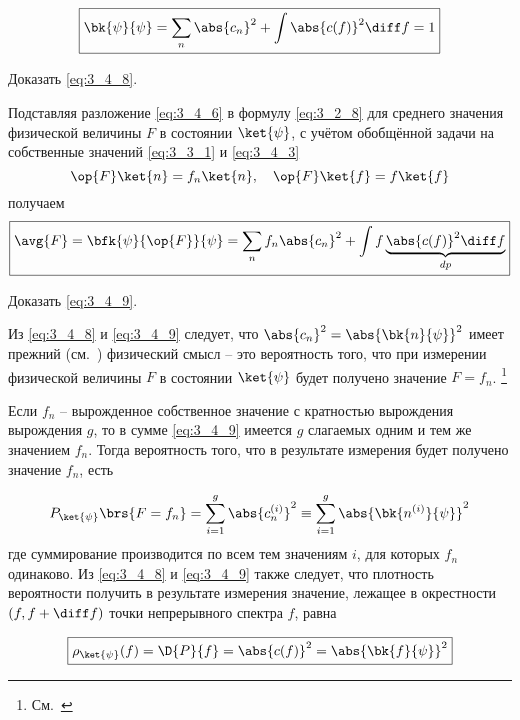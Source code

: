 \begin{equation}
\label{eq:3_4_8}
\boxed {
	\bk{\psi}{\psi} = \sum_n \abs{c_n}^2 + \int \abs{c(f)}^2 \diff f = 1
}
\end{equation}

\begin{excr}
Доказать \eqref{eq:3_4_8}.
\end{excr}


Подставляя разложение \eqref{eq:3_4_6} в формулу \eqref{eq:3_2_8} для среднего значения физической величины $F$ в состоянии $\ket{\psi}$, с учётом обобщённой задачи на собственные значений \eqref{eq:3_3_1} и \eqref{eq:3_4_3}
$$
\op{F} \ket{n} = f_n \ket{n}, ~~~ \op{F} \ket{f} = f \ket{f}
$$%
получаем
\begin{equation}
\label{eq:3_4_9}
\boxed {
	\avg{F} = \bfk{\psi}{\op{F}}{\psi} = \sum_n f_n \abs{c_n}^2 + \int f \underbrace{\abs{c(f)}^2 \diff f}_{dp}
}
\end{equation}

\begin{excr}
Доказать \eqref{eq:3_4_9}.
\end{excr}

Из \eqref{eq:3_4_8} и \eqref{eq:3_4_9} следует, что $\abs{c_n}^2 = \abs{\bk{n}{\psi}}^2$ имеет прежний (см.~) физический смысл -- это вероятность того, что при измерении физической величины $F$ в состоянии $\ket{\psi}$ будет получено значение $F = f_n$. \footnote{См.~}

Если $f_n$ -- вырожденное собственное значение с кратностью вырождения вырождения $g$, то в сумме \eqref{eq:3_4_9} имеется $g$ слагаемых одним и тем же значением $f_n$. Тогда вероятность того, что в результате измерения будет получено значение $f_n$, есть

\begin{equation}
\label{eq:3_4_10}
P_{\ket{\psi}} \brs{F = f_n} =
  \sum_{i=1}^{g} \abs{c_n^{(i)}}^2 \equiv
  \sum_{i=1}^{g} \abs{ \bk{n^{(i)}}{\psi} }^2
\end{equation}%
%
где суммирование производится по всем тем значениям $i$, для которых $f_n$ одинаково. Из \eqref{eq:3_4_8} и \eqref{eq:3_4_9} также следует, что плотность вероятности получить в результате измерения значение, лежащее в окрестности $(f, f + \diff f)$ точки непрерывного спектра $f$, равна

\begin{equation}
\label{eq:3_4_11}
\boxed {
	\rho_{\ket{\psi}}(f) = \D{P}{f} = \abs{c(f)}^2 = \abs{\bk{f}{\psi}}^2
}
\end{equation}
